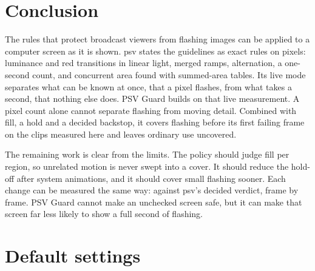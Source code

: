 \documentclass[11pt,a4paper]{article}
\newcommand{\psv}{\textsf{psv}}
\newcommand{\guard}{PSV Guard}
\begin{document}
\section{Conclusion}
\label{sec:conclusion}

The rules that protect broadcast viewers from flashing images can be applied to a computer screen as it is shown. \psv{} states the guidelines as exact rules on pixels: luminance and red transitions in linear light, merged ramps, alternation, a one-second count, and concurrent area found with summed-area tables. Its live mode separates what can be known at once, that a pixel flashes, from what takes a second, that nothing else does. \guard{} builds on that live measurement. A pixel count alone cannot separate flashing from moving detail. Combined with fill, a hold and a decided backstop, it covers flashing before its first failing frame on the clips measured here and leaves ordinary use uncovered.

The remaining work is clear from the limits. The policy should judge fill per region, so unrelated motion is never swept into a cover. It should reduce the hold-off after system animations, and it should cover small flashing sooner. Each change can be measured the same way: against \psv{}'s decided verdict, frame by frame. \guard{} cannot make an unchecked screen safe, but it can make that screen far less likely to show a full second of flashing.

\appendix
\section{Default settings}
\label{app:settings}
\end{document}
